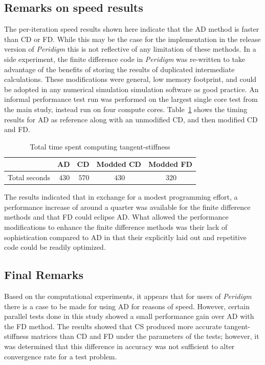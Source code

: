 \documentclass[preprint,12pt]{elsarticle}
\begin{document}
\subsection{Remarks on speed results}
%
The per-iteration speed results shown here indicate that the AD method is faster than CD or FD.  While this may be the case for the implementation in the release version of \emph{Peridigm} this is not reflective of any limitation of these methods. In a side experiment, the finite difference code in \emph{Peridigm} was re-written to take advantage of the benefits of storing the results of duplicated intermediate calculations. These modifications were general, low memory footprint, and could be adopted in any numerical simulation simulation software as good practice. An informal performance test run was performed on the largest single core test from the main study, instead run on four compute cores. Table~\ref{tab:PerformanceMod} shows the timing results for AD as reference along with an unmodified CD, and then modified CD and FD.
%
\begin{table}[tbp]   
\centering 
\caption{Total time spent computing tangent-stiffness} 
\label{tab:PerformanceMod}   
\begin{tabular}{c c c c c}
\toprule & AD & CD & Modded CD & Modded FD\\
\midrule  Total seconds & $~430$ & $~570$ & $~430$ &$~320$ \\ 
\bottomrule 
\end{tabular} 
\end{table}

The results indicated that in exchange for a modest programming effort, a performance increase of around a quarter was available for the finite difference methods and that FD could eclipse AD. What allowed the performance modifications to enhance the finite difference methods was their lack of sophistication compared to AD in that their explicitly laid out and repetitive code could be readily optimized. 

\subsection{Final Remarks}
%
Based on the computational experiments, it appears that for users of \emph{Peridigm} there is a case to be made for using AD for reasons of speed. However, certain parallel tests done in this study showed a small performance gain over AD with the FD method.  The results showed that CS produced more accurate tangent-stiffness matrices than CD and FD under the parameters of the tests; however, it was determined that this difference in accuracy was not sufficient to alter convergence rate for a test problem.  
\end{document}

